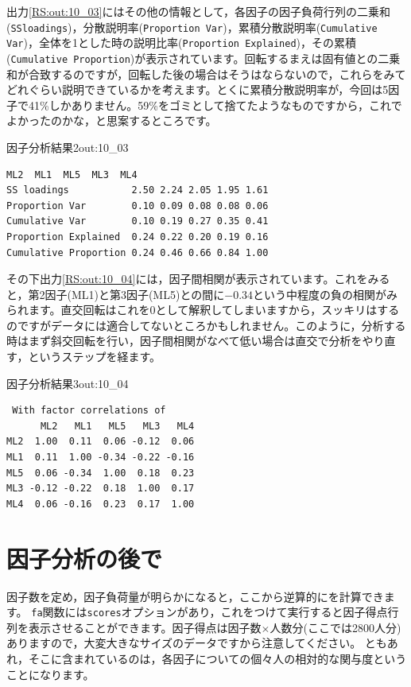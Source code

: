 \documentclass{ltjsbook}
\begin{document}
出力\ref{RS:out:10_03}にはその他の情報として，各因子の因子負荷行列の二乗和(\verb|SSloadings|)，分散説明率(\verb|Proportion Var|)，累積分散説明率(\verb|Cumulative Var|)，全体を1とした時の説明比率(\verb|Proportion Explained|)，その累積(\verb|Cumulative Proportion|)が表示されています。回転するまえは固有値との二乗和が合致するのですが，回転した後の場合はそうはならないので，これらをみてどれぐらい説明できているかを考えます。とくに累積分散説明率が，今回は5因子で41\%しかありません。59\%をゴミとして捨てたようなものですから，これでよかったのかな，と思案するところです。

\begin{Rscreen}{因子分析結果2}{out:10_03}
	\begin{verbatim}
ML2  ML1  ML5  ML3  ML4
SS loadings           2.50 2.24 2.05 1.95 1.61
Proportion Var        0.10 0.09 0.08 0.08 0.06
Cumulative Var        0.10 0.19 0.27 0.35 0.41
Proportion Explained  0.24 0.22 0.20 0.19 0.16
Cumulative Proportion 0.24 0.46 0.66 0.84 1.00
\end{verbatim}
\end{Rscreen}

その下出力\ref{RS:out:10_04}には，因子間相関が表示されています。これをみると，第2因子(ML1)と第3因子(ML5)との間に$-0.34$という中程度の負の相関がみられます。直交回転はこれを0として解釈してしまいますから，スッキリはするのですがデータには適合してないところかもしれません。このように，分析する時はまず斜交回転を行い，因子間相関がなべて低い場合は直交で分析をやり直す，というステップを経ます。

\begin{Rscreen}{因子分析結果3}{out:10_04}
	\begin{verbatim}
 With factor correlations of 
      ML2   ML1   ML5   ML3   ML4
ML2  1.00  0.11  0.06 -0.12  0.06
ML1  0.11  1.00 -0.34 -0.22 -0.16
ML5  0.06 -0.34  1.00  0.18  0.23
ML3 -0.12 -0.22  0.18  1.00  0.17
ML4  0.06 -0.16  0.23  0.17  1.00
\end{verbatim}
\end{Rscreen}

\section{因子分析の後で}

因子数を定め，因子負荷量が明らかになると，ここから逆算的にを計算できます。
\texttt{fa}関数には\texttt{scores}オプションがあり，これをつけて実行すると因子得点行列を表示させることができます。因子得点は因子数$\times$人数分(ここでは2800人分)ありますので，大変大きなサイズのデータですから注意してください。
ともあれ，そこに含まれているのは，各因子についての個々人の相対的な関与度ということになります。
\end{document}
